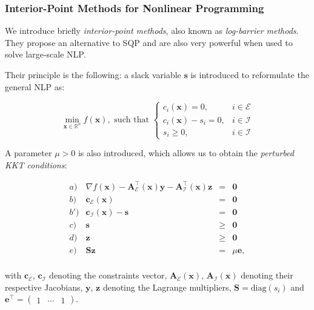 \subsubsection{Interior-Point Methods for Nonlinear Programming}

We introduce briefly \emph{interior-point methods}, also known as
\emph{log-barrier methods}. They propose an alternative to SQP and are
also very powerful when used to solve large-scale NLP.

Their principle is the following: a slack variable $\mathbf{s}$ is
introduced to reformulate the general NLP as:

\begin{equation}
\label{eq:chap3-nlp-slack}
\min_{\mathbf{x} \in \mathbb R^n}
f(\mathbf{x}),\text{ such that }
\left\{\begin{array}{cc}
c_i(\mathbf{x}) = 0, & i \in \mathcal{E} \\%
c_i(\mathbf{x})-s_i = 0, & i \in \mathcal{I} \\%
s_i \ge 0, & i \in \mathcal{I} %
\end{array}\right.
\end{equation}

A parameter $\mu>0$ is also introduced, which allows us to obtain the
\emph{perturbed KKT conditions}:

\begin{equation}
\label{eq:chap3-kkt-perturbed}
\begin{array}{crcl}
a) & \nabla f(\mathbf{x}) - \mathbf{A}_\mathcal{E}^{\top}(\mathbf{x})\mathbf{y} - \mathbf{A}_\mathcal{I}^{\top}(\mathbf{x})\mathbf{z} & = & \mathbf{0} \\%
b) & \mathbf{c}_{\mathcal{E}}(\mathbf{x}) & = & \mathbf{0} \\%
b')& \mathbf{c}_{\mathcal{I}}(\mathbf{x}) - \mathbf{s}& = & \mathbf{0} \\%
c) & \mathbf{s} & \ge & \mathbf{0} \\%
d) & \mathbf{z} & \ge & \mathbf{0} \\%
e) & \mathbf{S}\mathbf{z} & = & \mu\mathbf{e}, \\%
\end{array}
\end{equation}

with $\mathbf{c}_{\mathcal{E}}$, $\mathbf{c}_{\mathcal{I}}$ denoting
the constraints vector, $\mathbf{A}_\mathcal{E}(\mathbf{x})$,
$\mathbf{A}_\mathcal{I}(\mathbf{x})$ denoting their respective
Jacobians, $\mathbf{y}$, $\mathbf{z}$ denoting the Lagrange
multipliers, $\mathbf{S}=\text{diag}(s_i)$ and
$\mathbf{e}^\top=\left(\begin{matrix}1&\cdots&1\end{matrix}\right)$.

